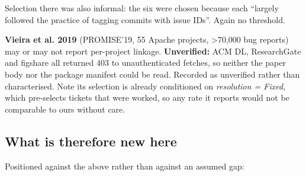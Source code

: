 \documentclass[conference]{IEEEtran}
\begin{document}
Selection there was also informal: the six were chosen because each ``largely followed the practice of tagging commits with issue IDs''. Again no threshold.

\textbf{Vieira et al. 2019} \cite{vieira2019reports} (PROMISE'19, 55 Apache projects, >70,000 bug reports) may or may not report per-project linkage. \textbf{Unverified:} ACM DL, ResearchGate and figshare all returned 403 to unauthenticated fetches, so neither the paper body nor the package manifest could be read. Recorded as unverified rather than characterised. Note its selection is already conditioned on \emph{resolution = Fixed}, which pre-selects tickets that were worked, so any rate it reports would not be comparable to ours without care.

\subsection{What is therefore new here}
\label{sec:2.2}

Positioned against the above rather than against an assumed gap:
\end{document}
